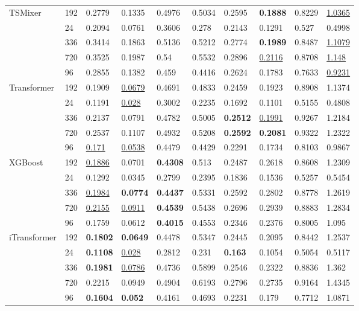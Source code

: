 \begin{tabular}{llllllllll}
\cline{1-10}
\multirow[t]{5}{*}{TSMixer} & 192 & 0.2779 & 0.1335 & 0.4976 & 0.5034 & 0.2595 & \textbf{0.1888} & 0.8229 & \underline{1.0365} \\
 & 24 & 0.2094 & 0.0761 & 0.3606 & 0.278 & 0.2143 & 0.1291 & 0.527 & 0.4998 \\
 & 336 & 0.3414 & 0.1863 & 0.5136 & 0.5212 & 0.2774 & \textbf{0.1989} & 0.8487 & \underline{1.1079} \\
 & 720 & 0.3525 & 0.1987 & 0.54 & 0.5532 & 0.2896 & \underline{0.2116} & 0.8708 & \underline{1.148} \\
 & 96 & 0.2855 & 0.1382 & 0.459 & 0.4416 & 0.2624 & 0.1783 & 0.7633 & \underline{0.9231} \\
\cline{1-10}
\multirow[t]{5}{*}{Transformer} & 192 & 0.1909 & \underline{0.0679} & 0.4691 & 0.4833 & 0.2459 & 0.1923 & 0.8908 & 1.1374 \\
 & 24 & 0.1191 & \underline{0.028} & 0.3002 & 0.2235 & 0.1692 & 0.1101 & 0.5155 & 0.4808 \\
 & 336 & 0.2137 & 0.0791 & 0.4782 & 0.5005 & \textbf{0.2512} & \underline{0.1991} & 0.9267 & 1.2184 \\
 & 720 & 0.2537 & 0.1107 & 0.4932 & 0.5208 & \textbf{0.2592} & \textbf{0.2081} & 0.9322 & 1.2322 \\
 & 96 & \underline{0.171} & \underline{0.0538} & 0.4479 & 0.4429 & 0.2291 & 0.1734 & 0.8103 & 0.9867 \\
\cline{1-10}
\multirow[t]{5}{*}{XGBoost} & 192 & \underline{0.1886} & 0.0701 & \textbf{0.4308} & 0.513 & 0.2487 & 0.2618 & 0.8608 & 1.2309 \\
 & 24 & 0.1292 & 0.0345 & 0.2799 & 0.2395 & 0.1836 & 0.1536 & 0.5257 & 0.5454 \\
 & 336 & \underline{0.1984} & \textbf{0.0774} & \textbf{0.4437} & 0.5331 & 0.2592 & 0.2802 & 0.8778 & 1.2619 \\
 & 720 & \underline{0.2155} & \underline{0.0911} & \textbf{0.4539} & 0.5438 & 0.2696 & 0.2939 & 0.8883 & 1.2834 \\
 & 96 & 0.1759 & 0.0612 & \textbf{0.4015} & 0.4553 & 0.2346 & 0.2376 & 0.8005 & 1.095 \\
\cline{1-10}
\multirow[t]{5}{*}{iTransformer} & 192 & \textbf{0.1802} & \textbf{0.0649} & 0.4478 & 0.5347 & 0.2445 & 0.2095 & 0.8442 & 1.2537 \\
 & 24 & \textbf{0.1108} & \underline{0.028} & 0.2812 & 0.231 & \textbf{0.163} & 0.1054 & 0.5054 & 0.5117 \\
 & 336 & \textbf{0.1981} & \underline{0.0786} & 0.4736 & 0.5899 & 0.2546 & 0.2322 & 0.8836 & 1.362 \\
 & 720 & 0.2215 & 0.0949 & 0.4904 & 0.6193 & 0.2796 & 0.2735 & 0.9164 & 1.4345 \\
 & 96 & \textbf{0.1604} & \textbf{0.052} & 0.4161 & 0.4693 & 0.2231 & 0.179 & 0.7712 & 1.0871 \\
\cline{1-10}
\bottomrule
\end{tabular}

